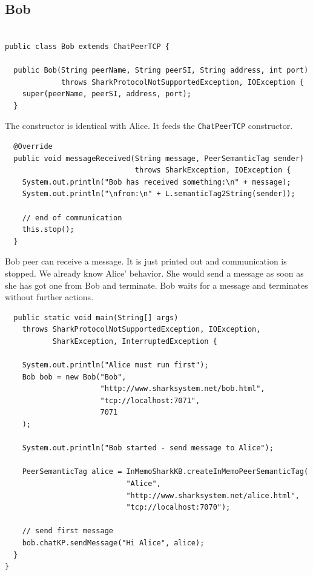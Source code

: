 {\subsection{Bob}
\begin{verbatim}

public class Bob extends ChatPeerTCP {

  public Bob(String peerName, String peerSI, String address, int port) 
             throws SharkProtocolNotSupportedException, IOException {
    super(peerName, peerSI, address, port);
  }
\end{verbatim}

The constructor is identical with Alice. It feeds the {\tt ChatPeerTCP} constructor.

\begin{verbatim}
  @Override
  public void messageReceived(String message, PeerSemanticTag sender) 
                              throws SharkException, IOException {
    System.out.println("Bob has received something:\n" + message);
    System.out.println("\nfrom:\n" + L.semanticTag2String(sender));

    // end of communication
    this.stop();
  }    
\end{verbatim}

Bob peer can receive a message. It is just printed out and communication is stopped. We already know Alice' behavior. She would send a message as soon as she has got one from Bob and terminate. Bob waits for a message and terminates without further actions.

\begin{verbatim}
  public static void main(String[] args) 
    throws SharkProtocolNotSupportedException, IOException, 
           SharkException, InterruptedException {

    System.out.println("Alice must run first");
    Bob bob = new Bob("Bob", 
                      "http://www.sharksystem.net/bob.html",
                      "tcp://localhost:7071",
                      7071
    );

    System.out.println("Bob started - send message to Alice");

    PeerSemanticTag alice = InMemoSharkKB.createInMemoPeerSemanticTag(
                            "Alice",                
                            "http://www.sharksystem.net/alice.html",
                            "tcp://localhost:7070");

    // send first message
    bob.chatKP.sendMessage("Hi Alice", alice);       
  } 
}
\end{verbatim}

}
